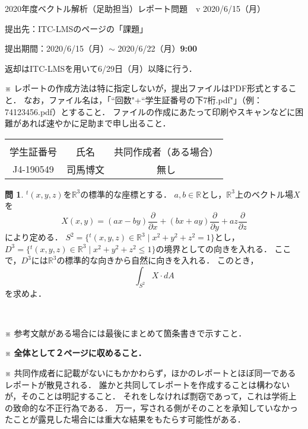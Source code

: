 \documentclass[dvipdfmx,uplatex,nosetpagesize]{jsarticle}
\newcommand\GAKUSEISHOBANGO{J4-190549}%
\newcommand\NAMAE{司馬博文}%
\newcommand\KYODOSAKUSEISHA{無し}%
\newcommand\R{\mathbb{R}}
\theoremstyle{definition}
\newtheorem*{question*}{問}
\theoremstyle{StatementsWithStar}
\theoremstyle{StatementsWithStar2}
\theoremstyle{StatementsWithStar3}
\theoremstyle{StatementsWithCCirc}
\theoremstyle{definition}
\begin{document}
\thispagestyle{empty}
\setlength{\parindent}{1zw}
\setlength{\baselineskip}{13pt}
\setcounter{section}{7}
\setcounter{version}{1}
\noindent
2020年度ベクトル解析（足助担当）レポート問題~\thesection~v\theversion%
\hfil2020/6/15（月）\par\noindent
提出先：ITC-LMSのページの「課題」\par\noindent
提出期間：2020/6/15（月）$\sim$ 2020/6/22（月）\textbf{9:00}\par\noindent
返却はITC-LMSを用いて6/29日（月）以降に行う．\par\noindent
※ レポートの作成方法は特に指定しないが，提出ファイルはPDF形式とすること．
なお，ファイル名は，「``回数"+``学生証番号の下7桁.pdf\/"」（例：74123456.pdf）とすること．
ファイルの作成にあたって印刷やスキャンなどに困難があれば速やかに足助まで申し出ること．
\vskip-18pt\noindent
\begin{table}[h]
\begin{tabular}{|c|c|c|} \hline
& & \\[-13pt]
学生証番号& 氏名 & 共同作成者（ある場合）\\[2pt] \hline
\rule{0pt}{16pt}%
\parbox[c]{9.2zw}{\GAKUSEISHOBANGO\hfill} & \parbox[c]{13.0zw}{\NAMAE\hfill} & \parbox[c]{25.6zw}{\KYODOSAKUSEISHA\hfill}\\[6pt] \hline
\end{tabular}
\end{table}

\noindent
\begin{question*}
${}^t(x,y,z)$を$\R^3$の標準的な座標とする．
$a,b\in\R$とし，$\R^3$上のベクトル場$X$を
\[
X(x,y)=(ax-by)\frac{\partial}{\partial x}+(bx+ay)\frac{\partial}{\partial y}+az\frac{\partial}{\partial z}
\]
により定める．
$S^2=\{{}^t(x,y,z)\in\R^3\mid x^2+y^2+z^2=1\}$とし，$D^3=\{{}^t(x,y,z)\in\R^3\mid x^2+y^2+z^2\leq1\}$の境界としての向きを入れる．
ここで，$D^3$には$\R^3$の標準的な向きから自然に向きを入れる．
このとき，
\[
\int_{S^2}X\cdot dA
\]
を求めよ．
\end{question*}
\par
\ \par
\noindent
{\small
※ 参考文献がある場合には最後にまとめて箇条書きで示すこと．\par\noindent
※ \textbf{全体として２ページに収めること．}\par\noindent
※ 共同作成者に記載がないにもかかわらず，ほかのレポートとほぼ同一であるレポートが散見される．
誰かと共同してレポートを作成することは構わないが，そのことは明記すること．
それをしなければ剽窃であって，これは学術上の致命的な不正行為である．
万一，写される側がそのことを承知していなかったことが露見した場合には重大な結果をもたらす可能性がある．
}
\end{document}
